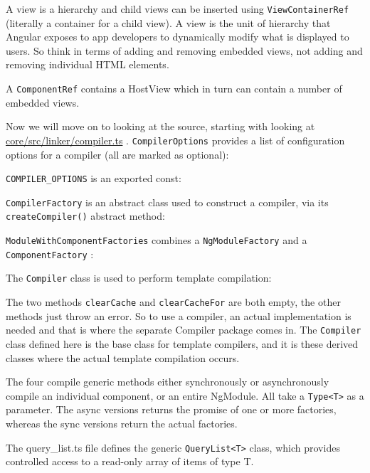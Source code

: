 A view is a hierarchy and child views can be inserted using
\texttt{ViewContainerRef}
(literally a container for a child view). A view is the unit of hierarchy that Angular
exposes to app developers to dynamically modify what is displayed to users. So think
in terms of adding and removing embedded views, not adding and removing individual
HTML elements.

A
\texttt{ComponentRef}
contains a HostView which in turn can contain a number of
embedded views.

Now we will move on to looking at the source, starting with looking at
\url{core/src/linker/compiler.ts}
.
\texttt{CompilerOptions}
provides a list of configuration options
for a compiler (all are marked as optional):



\texttt{COMPILER\_OPTIONS}
is an exported const:



\texttt{CompilerFactory}
is an abstract class used to construct a compiler, via its
\texttt{createCompiler()}
abstract method:



\texttt{ModuleWithComponentFactories}
combines a
\texttt{NgModuleFactory}
and a
\texttt{ComponentFactory}
:



The
\texttt{Compiler}
class is used to perform template compilation:



The two methods
\texttt{clearCache}
and
\texttt{clearCacheFor}
are both empty, the other methods
just throw an error. So to use a compiler, an actual implementation is needed and
that is where the separate Compiler package comes in. The
\texttt{Compiler}
class defined
here is the base class for template compilers, and it is these derived classes where the
actual template compilation occurs.

The four compile generic methods either synchronously or asynchronously compile an
individual component, or an entire NgModule. All take a
\texttt{Type<T>}
as a parameter. The
async versions returns the promise of one or more factories, whereas the sync
versions return the actual factories.

The query\_list.ts file defines the generic
\texttt{QueryList<T>}
class, which provides
controlled access to a read-only array of items of type T.

